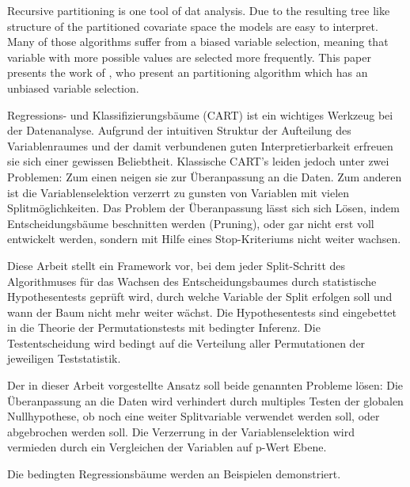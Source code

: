 Recursive partitioning is one tool of dat analysis. 
Due to the resulting tree like structure of the partitioned covariate space the 
models are easy to interpret. Many of those algorithms suffer from a biased 
variable selection, meaning that variable with more possible values are selected
more frequently.
This paper presents the work of \citet{hothorn2006unbiased}, who present an 
partitioning algorithm which has an unbiased variable selection. 








Regressions- und Klassifizierungsbäume (CART) ist ein wichtiges
Werkzeug bei der Datenanalyse. Aufgrund der intuitiven Struktur der
Aufteilung des Variablenraumes und der damit verbundenen guten
Interpretierbarkeit erfreuen sie sich einer gewissen Beliebtheit.
Klassische CART's leiden jedoch unter zwei Problemen: Zum einen neigen
sie zur Überanpassung an die Daten. Zum anderen ist die
Variablenselektion verzerrt zu gunsten von Variablen mit vielen
Splitmöglichkeiten.  Das Problem der Überanpassung lässt sich sich
Lösen, indem Entscheidungsbäume beschnitten werden (Pruning), oder gar
nicht erst voll entwickelt werden, sondern mit Hilfe eines
Stop-Kriteriums nicht weiter wachsen.

Diese Arbeit stellt ein Framework vor, bei dem jeder Split-Schritt
des Algorithmuses für das Wachsen des Entscheidungsbaumes durch
statistische Hypothesentests geprüft wird, durch welche Variable der Split
erfolgen soll und wann der Baum nicht mehr weiter wächst. Die
Hypothesentests sind eingebettet in die Theorie der
Permutationstests mit bedingter Inferenz. Die Testentscheidung wird bedingt auf die
Verteilung aller Permutationen der jeweiligen Teststatistik. 

Der in dieser Arbeit vorgestellte Ansatz soll beide genannten Probleme
lösen: Die Überanpassung an die Daten wird verhindert durch multiples
Testen der globalen Nullhypothese, ob noch eine weiter Splitvariable
verwendet werden soll, oder abgebrochen werden soll. 
Die Verzerrung in der Variablenselektion wird vermieden durch ein
Vergleichen der Variablen auf p-Wert Ebene. 

Die bedingten Regressionsbäume werden an Beispielen demonstriert. 
